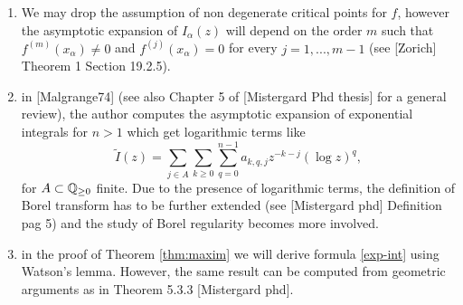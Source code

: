 \documentclass[11pt,a4paper,twoside,leqno,noamsfonts]{amsart}
\numberwithin{equation}{section}
\begin{document}
\begin{remark}
\begin{enumerate}
\item We may drop the assumption of non degenerate critical points for $f$, however the asymptotic expansion of $I_\alpha(z)$ will depend on the order $m$ such that $f^{(m)}(x_\alpha)\neq 0$ and $f^{(j)}(x_\alpha)=0$ for every $j=1,...,m-1$ (see [Zorich] Theorem 1 Section 19.2.5).  
\item in [Malgrange74] (see also Chapter 5 of [Mistergard Phd thesis] for a general review), the author computes the asymptotic expansion of exponential integrals for $n>1$ which get logarithmic terms like 
\[\tilde{I}(z)=\sum_{j\in A} \sum_{k\geq 0}\sum_{q=0}^{n-1}a_{k,q,j}z^{-k-j}(\log z)^q,\] for $A\subset\mathbb Q_{\geq 0}$ finite. Due to the presence of logarithmic terms, the definition of Borel transform has to be further extended  (see [Mistergard phd] Definition pag 5) and the study of Borel regularity becomes more involved.
\item in the proof of Theorem \ref{thm:maxim} we will derive formula \eqref{exp-int} using Watson's lemma. However, the same result can be computed from geometric arguments as in Theorem 5.3.3 [Mistergard phd].     
\end{enumerate}
\end{remark}
\end{document}
